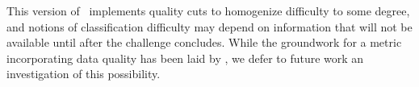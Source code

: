 This version of \plasticc\ implements quality cuts to homogenize difficulty to some degree, and notions of classification difficulty may depend on information that will not be available until after the challenge concludes.
While the groundwork for a metric incorporating data quality has been laid by \citet{wu_radio_2018}, we defer to future work an investigation of this possibility.
